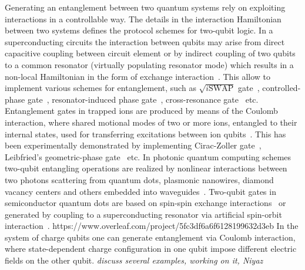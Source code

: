 \documentclass[twocolumn,superscriptaddress,unsortedaddress,
 amsmath,amssymb,
 aps,
]{revtex4-2}
\begin{document}
Generating an entanglement between two quantum systems rely on exploiting interactions in a controllable way. The details in the interaction Hamiltonian between two systems defines the protocol schemes for two-qubit logic. In a superconducting circuits the interaction between qubits may arise from direct capacitive coupling between circuit element or by indirect coupling of two qubits to a common resonator (virtually populating resonator mode) which results in a non-local Hamiltonian in the form of exchange interaction~\cite{blais2020circuit}. This allow to implement various schemes for entanglement, such as $\sqrt{i\text{SWAP}}$ gate~\cite{bialczak2010quantum}, controlled-phase gate~\cite{dicarlo2009demonstration}, resonator-induced phase gate~\cite{paik2016experimental}, cross-resonance gate~\cite{chow2011simple} etc. Entanglement gates in trapped ions are produced by means of the Coulomb interaction, where shared motional modes of two or more ions, entangled to their internal states, used for transferring excitations between ion qubits~\cite{cirac1995quantum}. This has been experimentally demonstrated by implementing Cirac-Zoller gate~\cite{turchette1998deterministic}, Leibfried’s geometric-phase gate~\cite{leibfried2003experimental} etc. In photonic quantum computing schemes two-qubit entangling operations are realized by nonlinear interactions between two photons scattering from quantum dots, plasmonic nanowires, diamond vacancy centers and others embedded into waveguides~\cite{bartlett2020universal}. Two-qubit gates in semiconductor quantum dots are based on spin-spin exchange interactions~\cite{brunner2011two,watson2018programmable} or generated by coupling to a superconducting resonator via artificial spin-orbit interaction~\cite{borjans2020resonant}.
https://www.overleaf.com/project/5fc3df6a6f6128199632d3eb
In the system of charge qubits one can generate entanglement via Coulomb interaction, where state-dependent charge configuration in one qubit impose different electric fields on the other qubit. \textit{discuss several examples, working on it, Niyaz}
\end{document}

